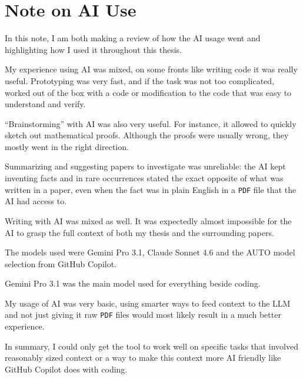 \begingroup
\let\clearpage\relax
\let\cleardoublepage\relax
\let\cleardoublepage\relax

\chapter*{Note on AI Use}

In this note, I am both making a review of how the AI usage went and highlighting how I used it throughout this thesis. 

My experience using AI was mixed, on some fronts like writing code it was really useful. Prototyping was very fast, and if the task was not too complicated, worked out of the box with a code or modification to the code that was easy to understand and verify. 

``Brainstorming'' with AI was also very useful. For instance, it allowed to quickly sketch out mathematical proofs. Although the proofs were usually wrong, they mostly went in the right direction.

Summarizing and suggesting papers to investigate was unreliable: the AI kept inventing facts and in rare occurrences stated the exact opposite of what was written in a paper, even when the fact was in plain English in a \texttt{PDF} file that the AI had access to.

Writing with AI was mixed as well. It was expectedly almost impossible for the AI to grasp the full context of both my thesis and the surrounding papers.

The models used were Gemini Pro 3.1, Claude Sonnet 4.6 and the AUTO model selection from GitHub Copilot. 

Gemini Pro 3.1 was the main model used for everything beside coding.

My usage of AI was very basic, using smarter ways to feed context to the LLM and not just giving it raw \texttt{PDF} files would most likely result in a much better experience. 

In summary, I could only get the tool to work well on specific tasks that involved reasonably sized context or a way to make this context more AI friendly like GitHub Copilot does with coding.
\vfill

\endgroup			

\vfill